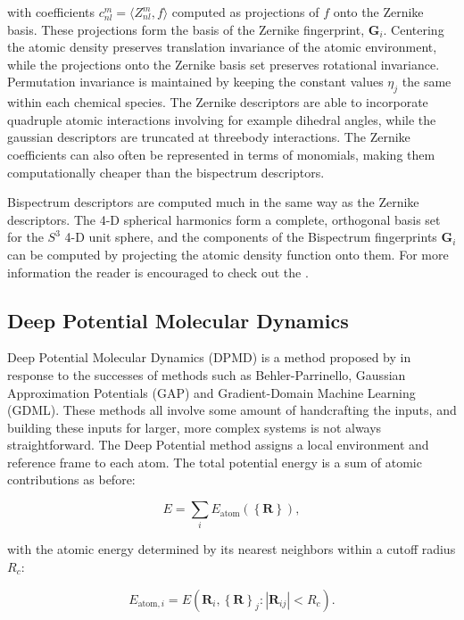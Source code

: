 with coefficients $c_{nl}^m = \langle Z_{nl}^m, f \rangle$
computed as projections of $f$ onto the Zernike basis.
These projections form the basis of the Zernike fingerprint,
$\bm{G}_i$. Centering the atomic density preserves translation
invariance of the atomic environment, while the projections
onto the Zernike basis set preserves rotational invariance.
Permutation invariance is maintained by keeping the constant values
$\eta_j$ the same within each chemical species.
The Zernike descriptors are able to incorporate quadruple
atomic interactions involving for example dihedral angles,
while the gaussian descriptors are truncated at threebody
interactions. The Zernike coefficients can also often be represented
in terms of monomials, making them computationally cheaper
than the bispectrum descriptors.
\par
Bispectrum descriptors are computed much in the same way
as the Zernike descriptors. The 4-D spherical harmonics
form a complete, orthogonal basis set for the $S^3$ 4-D unit
sphere, and the components of the Bispectrum fingerprints
$\bm{G}_i$ can be computed by projecting the atomic
density function onto them. For more information
the reader is encouraged to check out the \parencite[AMP paper]
{khorshidi2016amp}.

\subsection{Deep Potential Molecular Dynamics}
Deep Potential Molecular Dynamics (DPMD) is a method
proposed by \parencite[Zhang et al.]{PhysRevLett.120.143001}
in response to the successes of methods such as Behler-Parrinello,
Gaussian Approximation Potentials (GAP\cite{PhysRevLett.104.136403})
and Gradient-Domain Machine Learning (GDML\cite{Chmielae1603015}).
These methods all involve some amount of handcrafting the inputs,
and building these inputs for larger, more complex systems is not
always straightforward.
The Deep Potential method assigns a local environment and reference
frame to each atom. The total potential energy is a sum
of atomic contributions as before:

\begin{equation}
 E = \sum_i E_{\text{atom}}\left( \left\{ \bm{R} \right\} \right),
\end{equation}

with the atomic energy determined by its nearest neighbors
within a cutoff radius $R_c$:

\begin{equation}
    E_{\text{atom},i} = E\left(\bm{R}_i,
    \left\{ \bm{R} \right\}_j : \left| \bm{R}_{ij}
    \right| < R_c \right) . 
\end{equation}

